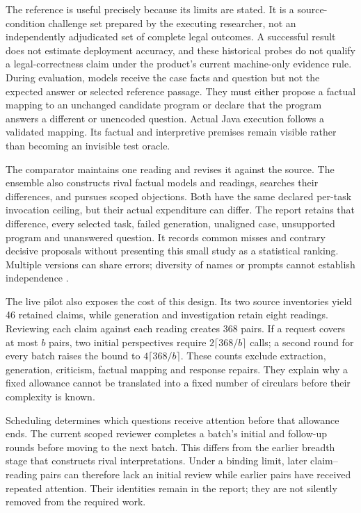 The reference is useful precisely because its limits are stated. It is a
source-condition challenge set prepared by the executing researcher, not an
independently adjudicated set of complete legal outcomes. A successful result
does not estimate deployment accuracy, and these historical probes do not
qualify a legal-correctness claim under the product's current machine-only
evidence rule. During evaluation, models receive the
case facts and question but not the expected answer or selected reference
passage. They must either propose a factual mapping to an unchanged candidate
program or declare that the program answers a different or unencoded question.
Actual Java execution follows a validated mapping. Its factual and interpretive
premises remain visible rather than becoming an invisible test oracle.

The comparator maintains one reading and revises it against the source. The
ensemble also constructs rival factual models and readings, searches their
differences, and pursues scoped objections. Both have the same declared per-task
invocation ceiling, but their actual expenditure can differ. The report retains
that difference, every selected task, failed generation, unaligned case,
unsupported program and unanswered question. It records common misses and
contrary decisive proposals without presenting this small study as a statistical
ranking. Multiple versions can share errors; diversity of names or prompts
cannot establish independence \citep{knight1986diversity,littlewood2001diversity}.

The live pilot also exposes the cost of this design. Its two source inventories
yield 46 retained claims, while generation and investigation retain eight
readings. Reviewing each claim against each reading creates 368 pairs. If a
request covers at most $b$ pairs, two initial perspectives require
$2\lceil 368/b\rceil$ calls; a second round for every batch raises the bound to
$4\lceil 368/b\rceil$. These counts exclude extraction, generation, criticism,
factual mapping and response repairs. They explain why a fixed allowance cannot
be translated into a fixed number of circulars before their complexity is known.

Scheduling determines which questions receive attention before that allowance
ends. The current scoped reviewer completes a batch's initial and follow-up
rounds before moving to the next batch. This differs from the earlier breadth
stage that constructs rival interpretations. Under a binding limit, later
claim--reading pairs can therefore lack an initial review while earlier pairs
have received repeated attention. Their identities remain in the report; they
are not silently removed from the required work.

